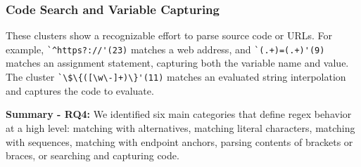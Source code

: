 \subsubsection{Code Search and Variable Capturing}
\label{cluster:search}
These clusters show a recognizable effort to parse source code or URLs. For example,
\verb!`^https?://'(23)! matches a web address, and \verb!`(.+)=(.+)'(9)! matches an assignment statement, capturing both the variable name and value.
The cluster  \verb!`\$\{([\w\-]+)\}'(11)! matches an evaluated string interpolation and captures the code to evaluate.

\vspace{6pt}
\textbf{Summary - RQ4:}
We identified six main categories that define regex behavior at a high level: matching with alternatives, matching literal characters, matching with sequences, matching with endpoint anchors, parsing contents of brackets or braces, or searching and capturing code.
